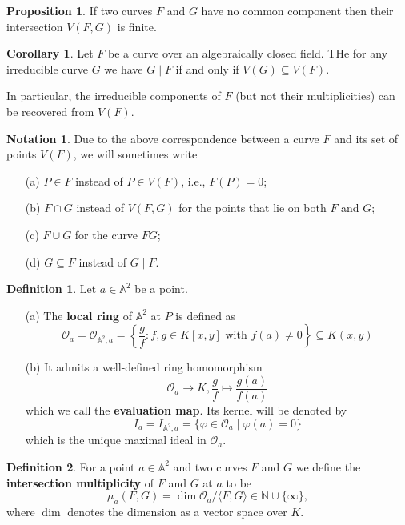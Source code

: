 \documentclass[12pt]{article}
\theoremstyle{definition}
\newtheorem{cor}{Corollary}
\newtheorem{prop}{Proposition}
\newtheorem{defn}{Definition}
\newtheorem{notation}{Notation}
\newcommand{\N}{\mathbb{N}}
\renewcommand{\phi}{\varphi}
\newcommand{\<}{\langle}
\renewcommand{\>}{\rangle}
\newcommand{\A}{\mathbb{A}}
\renewcommand{\O}{\mathscr{O}}
\begin{document}
\begin{prop}
    If two curves $F$ and $G$ have no common component then their intersection $V(F, G)$ is finite.
\end{prop}

\begin{cor}
    Let $F$ be a curve over an algebraically closed field. THe for any irreducible curve $G$ we have $G \mid F$ if and only if $V(G) \subseteq V(F)$.

    In particular, the irreducible components of $F$ (but not their multiplicities) can be recovered from $V(F)$.
\end{cor}


\begin{notation}
    Due to the above correspondence between a curve $F$ and its set of points $V(F)$, we will sometimes write
    \begin{itemize}
        \item[(a)] $P \in F$ instead of $P \in V(F)$, i.e., $F(P) = 0$;
        \item[(b)] $F \cap G$ instead of $V(F, G)$ for the points that lie on both $F$ and $G$;
        \item[(c)] $F \cup G$ for the curve $FG$;
        \item[(d)] $G \subseteq F$ instead of $G \mid F$.
    \end{itemize}
\end{notation}


\begin{defn}
    Let $a \in \A^2$ be a point.
    \begin{itemize}
        \item[(a)] The \textbf{local ring} of $\A^2$ at $P$ is defined as
        \[
            \O_a 
                = \O_{\A^2, a} 
                = \left\{\frac{g}{f} : f, g \in K[x, y] \text{ with } f(a) \ne 0 \right\}
                \subseteq K(x, y)
        \]
        \item[(b)] It admits a well-defined ring homomorphism
        \[
            \O_a \to K, \frac{g}{f} \mapsto \frac{g(a)}{f(a)}
        \] 
        which we call the \textbf{evaluation map}. Its kernel will be denoted by
        \[
            I_a = I_{\A^2, a} = \{\phi \in \O_a \mid \phi(a) = 0\}
        \]
        which is the unique maximal ideal in $\O_a$.
    \end{itemize}
\end{defn}


\begin{defn}
    For a point $a \in \A^2$ and two curves $F$ and $G$ we define the \textbf{intersection multiplicity} of $F$ and $G$ at $a$ to be
    \[
        \mu_a(F, G) = \dim \O_a / \<F, G\> \in \N \cup \{\infty\},
    \]
    where $\dim$ denotes the dimension as a vector space over $K$.
\end{defn}
\end{document}

